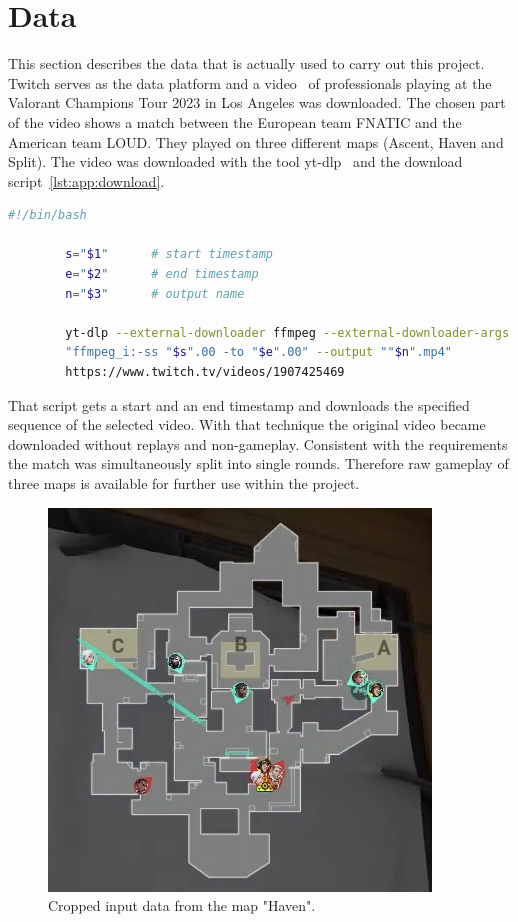 \section{Data}\label{sec:app:data}

This section describes the data that is actually used to carry out this project. Twitch serves as the 
data platform and a video~\cite{valVideo2023} of professionals playing at the Valorant 
Champions Tour 2023 in Los Angeles was downloaded. The chosen part of the video shows a match 
between the European team FNATIC and the American team LOUD. They played on three different 
maps (Ascent, Haven and Split). The video was downloaded with the tool yt-dlp~\cite{ytdlp2023} 
and the download script~\ref{lst:app:download}. 

\begin{minipage}{\linewidth}
	\vspace*{0.5cm}
	\begin{lstlisting}[language=Bash, keywordstyle=\color{black}, 
		caption=Download script to get the raw data., label=lst:app:download]
		#!/bin/bash
		
		s="$1"		# start timestamp
		e="$2"		# end timestamp
		n="$3"		# output name
		
		yt-dlp --external-downloader ffmpeg --external-downloader-args 
		"ffmpeg_i:-ss "$s".00 -to "$e".00" --output ""$n".mp4" 
		https://www.twitch.tv/videos/1907425469
	\end{lstlisting}
\end{minipage}

That script gets a start and an end timestamp and downloads the specified sequence of the selected 
video. With that technique the original video became downloaded without replays and 
non-gameplay. Consistent with the requirements the match was simultaneously split into single 
rounds. Therefore raw gameplay of three maps is available for further use within the project.

\begin{figure}
	\centering
	\includegraphics[width=0.7\linewidth]{images/06-input}
	\caption[Cropped input data.]{Cropped input data from the map "Haven".}
	\label{fig:app:input}
\end{figure}


